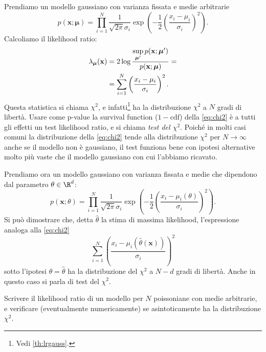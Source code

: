 Prendiamo un modello gaussiano con varianza fissata e medie arbitrarie
\begin{equation*}
	p(\mathbf x;\boldsymbol\mu)
	= \prod_{i=1}^N \frac1{\sqrt{2\pi}\sigma_i}
	\exp\left(-\frac12\left(\frac{x_i-\mu_i}{\sigma_i}\right)^2\right).
\end{equation*}
Calcoliamo il likelihood ratio:
\begin{align}
	\lambda_{\boldsymbol\mu}(\mathbf x)
	&= 2\log \frac
	{\sup\limits_{\boldsymbol\mu'} p(\mathbf x;\boldsymbol\mu')}
	{p(\mathbf x;\boldsymbol\mu)} = \notag \\
	&= \sum_{i=1}^N \left(\frac{x_i-\mu_i}{\sigma_i}\right)^2. \label{eq:chi2}
\end{align}
Questa statistica si chiama $\chi^2$,
e infatti\footnote{Vedi \autoref{th:lrgauss}.} ha la distribuzione $\chi^2$ a $N$ gradi di libertà.
Usare come p-value la survival function ($1-\text{cdf}$) della \eqref{eq:chi2}
è a tutti gli effetti un test likelihood ratio,
e si chiama \emph{test del $\chi^2$}.
Poiché in molti casi comuni la distribuzione della \eqref{eq:chi2} tende alla distribuzione $\chi^2$
per $N\to\infty$ anche se il modello non è gaussiano,
il test funziona bene con ipotesi alternative molto più vaste che il modello gaussiano con cui l'abbiamo ricavato.

Prendiamo ora un modello gaussiano con varianza fissata e medie che dipendono dal parametro $\theta\in\R^d$:
\begin{equation*}
	p(\mathbf x;\theta)
	= \prod_{i=1}^N \frac1{\sqrt{2\pi}\sigma_i}
	\exp\left(-\frac12\left(\frac{x_i-\mu_i(\theta)}{\sigma_i}\right)^2\right).
\end{equation*}
Si può dimostrare che,
detta $\hat\theta$ la stima di massima likelihood,
l'espressione analoga alla \eqref{eq:chi2}
\begin{equation*}
	\sum_{i=1}^N \left( \frac {x_i-\mu_i(\hat\theta(\mathbf x))} {\sigma_i} \right)^2
\end{equation*}
%
sotto l'ipotesi $\theta=\hat\theta$ ha la distribuzione del $\chi^2$ a $N-d$ gradi di libertà.
Anche in questo caso si parla di test del $\chi^2$.

\begin{exercise}
	Scrivere il likelihood ratio di un modello per $N$ poissoniane con medie arbitrarie,
	e verificare (eventualmente numericamente) se asintoticamente ha la distribuzione $\chi^2$.
\end{exercise}
